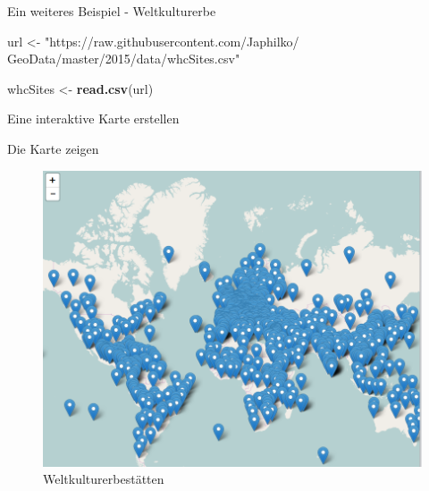 \documentclass[ignorenonframetext,]{beamer}
\newenvironment{Shaded}{\begin{snugshade}}{\end{snugshade}}
\newcommand{\KeywordTok}[1]{\textcolor[rgb]{0.26,0.66,0.93}{\textbf{#1}}}
\newcommand{\DataTypeTok}[1]{\textcolor[rgb]{0.74,0.68,0.62}{\underline{#1}}}
\newcommand{\StringTok}[1]{\textcolor[rgb]{0.02,0.61,0.04}{#1}}
\newcommand{\CommentTok}[1]{\textcolor[rgb]{0.00,0.40,1.00}{\textit{#1}}}
\newcommand{\OperatorTok}[1]{\textcolor[rgb]{0.74,0.68,0.62}{#1}}
\newcommand{\NormalTok}[1]{\textcolor[rgb]{0.74,0.68,0.62}{#1}}
\begin{document}
\begin{frame}[fragile]{Ein weiteres Beispiel - Weltkulturerbe}

\begin{Shaded}
\begin{Highlighting}[]
\NormalTok{url <-}\StringTok{ "https://raw.githubusercontent.com/Japhilko/}
\StringTok{GeoData/master/2015/data/whcSites.csv"}

\NormalTok{whcSites <-}\StringTok{ }\KeywordTok{read.csv}\NormalTok{(url) }
\end{Highlighting}
\end{Shaded}

\end{frame}

\begin{frame}[fragile]{Eine interaktive Karte erstellen}

\begin{Shaded}
\end{Shaded}

\end{frame}

\begin{frame}{Die Karte zeigen}

\begin{figure}
\centering
\includegraphics{figure/WHCPopUps.PNG}
\caption{Weltkulturerbestätten}
\end{figure}

\end{frame}
\end{document}
